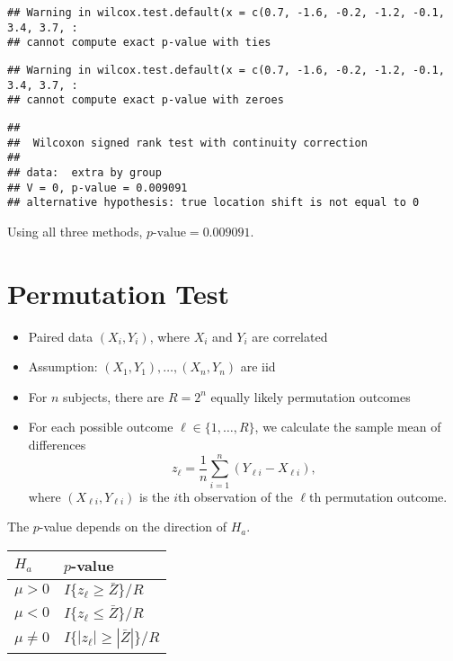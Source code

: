 \documentclass[
]{book}
\providecommand{\tightlist}{%
  \setlength{\itemsep}{0pt}\setlength{\parskip}{0pt}}
\begin{document}
\begin{verbatim}
## Warning in wilcox.test.default(x = c(0.7, -1.6, -0.2, -1.2, -0.1, 3.4, 3.7, :
## cannot compute exact p-value with ties
\end{verbatim}

\begin{verbatim}
## Warning in wilcox.test.default(x = c(0.7, -1.6, -0.2, -1.2, -0.1, 3.4, 3.7, :
## cannot compute exact p-value with zeroes
\end{verbatim}

\begin{verbatim}
## 
##  Wilcoxon signed rank test with continuity correction
## 
## data:  extra by group
## V = 0, p-value = 0.009091
## alternative hypothesis: true location shift is not equal to 0
\end{verbatim}

Using all three methods, \(p\text{-value} = 0.009091\).

\hypertarget{permutation-test}{%
\section{Permutation Test}\label{permutation-test}}

\begin{itemize}
\tightlist
\item
  Paired data \((X_i, Y_i)\), where \(X_i\) and \(Y_i\) are correlated
\item
  Assumption: \((X_1, Y_1), \dots, (X_n, Y_n)\) are iid
\item
  For \(n\) subjects, there are \(R = 2^n\) equally likely permutation outcomes
\item
  For each possible outcome \(\ell \in \{1, \dots, R\}\), we calculate the sample mean of differences
  \[z_\ell = \frac{1}{n} \sum_{i=1}^n (Y_{\ell i} - X_{\ell i}),\]
  where \((X_{\ell i}, Y_{\ell i})\) is the \(i\)th observation of the \(\ell\)th permutation outcome.
\end{itemize}

The \(p\)-value depends on the direction of \(H_a\).

\begin{longtable}[]{@{}ll@{}}
\toprule
\(H_a\) & \(p\)-value\tabularnewline
\midrule
\endhead
\(\mu > 0\) & \(I\{z_\ell \geq \bar{Z}\} / R\)\tabularnewline
\(\mu < 0\) & \(I\{z_\ell \leq \bar{Z}\} / R\)\tabularnewline
\(\mu \neq 0\) & \(I\{|z_\ell| \geq |\bar{Z}|\} / R\)\tabularnewline
\bottomrule
\end{longtable}
\end{document}
